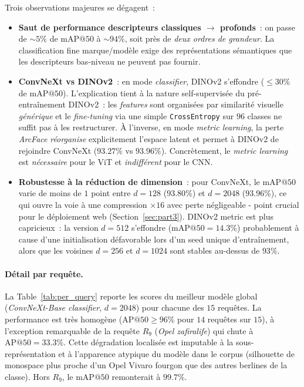 \documentclass[a4paper,11pt]{article}
\begin{document}
Trois observations majeures se dégagent~:
\begin{itemize}
    \item \textbf{Saut de performance descripteurs classiques
    $\rightarrow$ profonds}~: on passe de $\sim 5\%$ de $\text{mAP}@50$
    à $\sim 94\%$, soit près de \emph{deux ordres de grandeur}. La
    classification fine marque/modèle exige des représentations
    sémantiques que les descripteurs bas-niveau ne peuvent pas fournir.

    \item \textbf{ConvNeXt vs DINOv2}~: en mode \textit{classifier},
    DINOv2 s'effondre ($\le 30\%$ de $\text{mAP}@50$). L'explication
    tient à la nature self-supervisée du pré-entraînement DINOv2~: les
    \textit{features} sont organisées par similarité visuelle
    \emph{générique} et le \textit{fine-tuning} via une simple
    \texttt{CrossEntropy} sur $96$ classes ne suffit pas à les
    restructurer. À l'inverse, en mode \textit{metric learning}, la perte
    \textit{ArcFace} \emph{réorganise} explicitement l'espace latent et
    permet à DINOv2 de rejoindre ConvNeXt ($93.27\%$ vs $93.96\%$).
    Concrètement, le \textit{metric learning} est \emph{nécessaire} pour
    le ViT et \emph{indifférent} pour le CNN.

    \item \textbf{Robustesse à la réduction de dimension}~: pour
    ConvNeXt, le $\text{mAP}@50$ varie de moins de $1$ point entre
    $d=128$ ($93.80\%$) et $d=2048$ ($93.96\%$), ce qui ouvre la voie à
    une compression $\times 16$ avec perte négligeable - point crucial
    pour le déploiement web (Section~\ref{sec:part3}). DINOv2 metric est
    plus capricieux~: la version $d=512$ s'effondre
    ($\text{mAP}@50 = 14.3\%$) probablement à cause d'une initialisation
    défavorable lors d'un seed unique d'entraînement, alors que les
    voisines $d=256$ et $d=1024$ sont stables au-dessus de $93\%$.
\end{itemize}

\paragraph{Détail par requête.}
La Table~\ref{tab:per_query} reporte les scores du meilleur modèle global
(\textit{ConvNeXt-Base classifier}, $d=2048$) pour chacune des $15$
requêtes. La performance est très homogène ($\text{AP}@50 \ge 96\%$ pour
$14$ requêtes sur $15$), à l'exception remarquable de la requête $R_9$
(\textit{Opel zafiralife}) qui chute à $\text{AP}@50 = 33.3\%$. Cette
dégradation localisée est imputable à la sous-représentation et à
l'apparence atypique du modèle dans le corpus (silhouette de monospace
plus proche d'un Opel Vivaro fourgon que des autres berlines de la
classe). Hors $R_9$, le $\text{mAP}@50$ remonterait à $99.7\%$.
\end{document}
